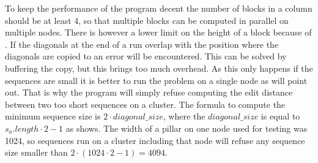 To keep the performance of the program decent the number of blocks in a column should be at least 4, so that multiple blocks can be computed in parallel on multiple nodes.
There is however a lower limit on the height of a block because of .
If the diagonals at the end of a run overlap with the position where the diagonals are copied to an error will be encountered.
This can be solved by buffering the copy, but this brings too much overhead.
As this only happens if the sequences are small it is better to run the problem on a single node as  will point out.
That is why the program will simply refuse computing the edit distance between two too short sequences on a cluster.
The formula to compute the minimum sequence size is $2 \cdot diagonal\_size$, where the $diagonal\_size$ is equal to $s_a.length \cdot 2 - 1$ as  shows.
The width of a pillar on one node used for testing was 1024, so sequences run on a cluster including that node will refuse any sequence size smaller than $2 \cdot (1024 \cdot 2 - 1) = 4094$.

